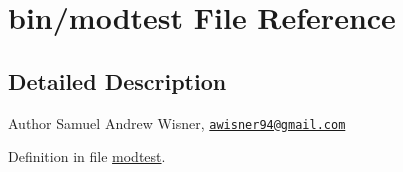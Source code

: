 \hypertarget{modtest}{\section{bin/modtest File Reference}
\label{modtest}
}


\subsection{Detailed Description}
\begin{DoxyAuthor}{Author}
Samuel Andrew Wisner, \href{mailto:awisner94@gmail.com}{\tt awisner94@gmail.\+com} 
\end{DoxyAuthor}


Definition in file \hyperlink{modtest_source}{modtest}.

